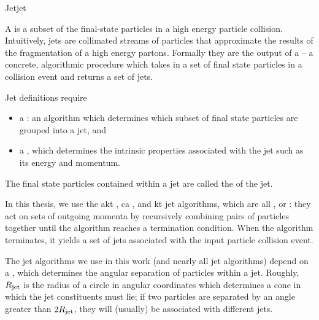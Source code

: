 \begin{definitionbox}{Jet}{jet}



    A  is a subset of the final-state particles in a high energy particle collision.
    Intuitively, jets are collimated streams of particles that approximate the results of the fragmentation of a high energy partons.
    Formally they are the output of a  -- a concrete, algorithmic procedure which takes in a set of final state particles in a collision event and returns a set of jets.

    Jet definitions require
    \begin{itemize}
        \item
            a :
            an algorithm which determines which subset of final state particles are grouped into a jet, and

        \item
            a , which determines the intrinsic properties associated with the jet such as its energy and momentum.
    \end{itemize}

    The final state particles contained within a jet are called the  of the jet.
\end{definitionbox}


In this thesis, we use the \gls{akt} \cite{}, \gls{ca} \cite{}, and \gls{kt} \cite{} jet algorithms, which are all , or :
%
they act on sets of outgoing momenta by recursively combining pairs of particles together until the algorithm reaches a termination condition.
%
When the algorithm terminates, it yields a set of jets associated with the input particle collision event.

The jet algorithms we use in this work (and nearly all jet algorithms) depend on a  \Rjet, which determines the angular separation of particles within a jet.
%
Roughly, \(R_\text{jet}\) is the radius of a circle in angular coordinates which determines a cone in which the jet constituents must lie;
%
if two particles are separated by an angle greater than \(2 R_\text{jet}\), they will (usually) be associated with different jets.


